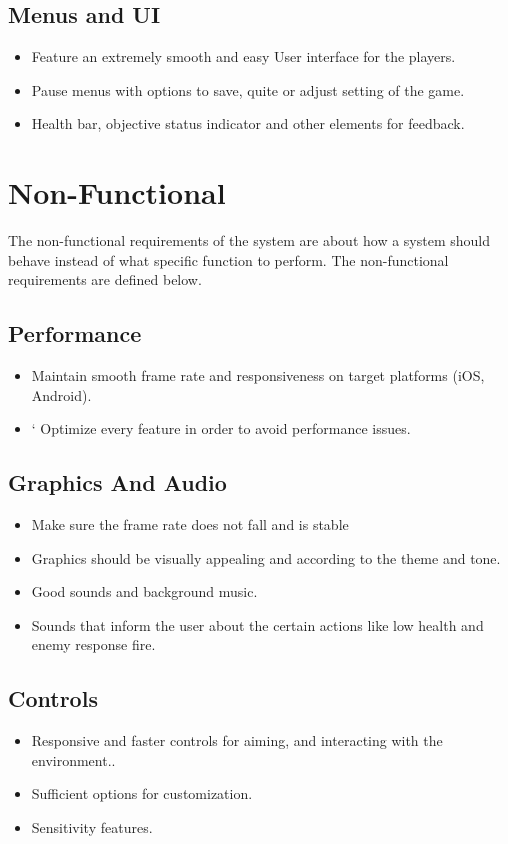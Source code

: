 \subsection{Menus and UI}
\begin{itemize}
	\item	Feature an extremely smooth and easy User interface for the players.
	\item 	Pause menus with options to save, quite or adjust setting of the game.
	\item 	Health bar, objective status indicator and other elements for feedback.
\end{itemize}

\section{Non-Functional}
The non-functional requirements of the system are about how a system should behave instead of what specific function to perform. The non-functional requirements are defined below.
\subsection{Performance}
\begin{itemize}
	\item 	Maintain smooth frame rate and responsiveness on target platforms (iOS, Android).
	\item`	Optimize every feature in order to avoid performance issues.
\end{itemize}
\subsection{Graphics And Audio}
\begin{itemize}
	\item   Make sure the frame rate does not fall and is stable \cite {singh2023effect}
	\item 	Graphics should be visually appealing and according to the theme and tone.
	\item 	Good sounds and background music.
	\item 	Sounds that inform the user about the certain actions like low health and enemy response fire.
\end{itemize}
\subsection{Controls}
\begin{itemize}
	\item 	Responsive and faster controls for aiming, and interacting with the environment..
	\item 	Sufficient options for customization.
	\item 	Sensitivity features.
\end{itemize}
